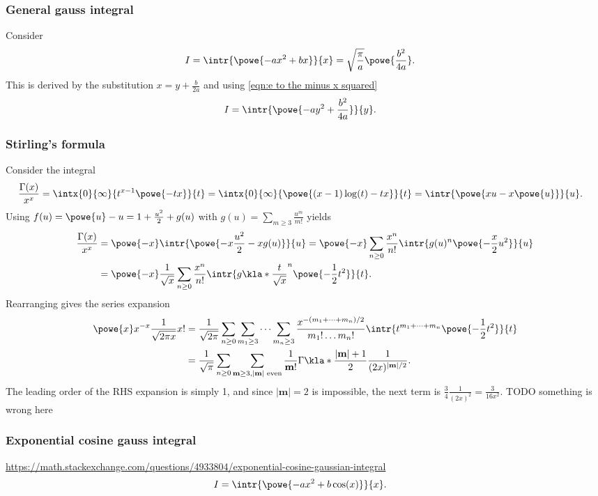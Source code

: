 \documentclass[english, parskip=full]{scrartcl}
\begin{document}
\subsubsection{General gauss integral}
Consider
\begin{align}
I &= \intr{\powe{-ax^2 + bx}}{x} = \sqrt{\frac{\pi}{a}} \powe{\frac{b^2}{4a}}. \label{eqn:e to the minus a x squared plus b x}
\end{align}
This is derived by the substitution $x = y + \frac{b}{2a}$ and using \autoref{eqn:e to the minus x squared}
\begin{align}
I &= \intr{\powe{-ay^2 + \frac{b^2}{4a}}}{y}.
\end{align}
\subsubsection{Stirling's formula}
Consider the integral
\begin{align}
\frac{\Gamma(x)}{x^{x}} &= \intx{0}{\infty}{t^{x-1}\powe{-tx}}{t} = \intx{0}{\infty}{ \powe{(x-1)\log(t) - tx} }{t} = \intr{\powe{xu - x\powe{u}}}{u}.
\end{align}
Using $f(u)=\powe{u}-u = 1 + \frac{u^2}{2} + g(u)$ with $g(u) = \sum_{m\ge 3} \frac{u^m}{m!}$ yields
\begin{align}
\frac{\Gamma(x)}{x^{x}} &= \powe{-x} \intr{\powe{-x\frac{u^2}{2} - xg(u)}}{u} = \powe{-x} \sum_{n\ge 0} \frac{x^n}{n!} \intr{g(u)^n \powe{-\frac{x}{2}u^2}}{u} \\
&= \powe{-x} \frac{1}{\sqrt{x}} \sum_{n\ge 0} \frac{x^n}{n!} \intr{g\kla*{\frac{t}{\sqrt{x}}}^n \powe{-\frac{1}{2}t^2}}{t}.
\end{align}
Rearranging gives the series expansion
\begin{align}
\powe{x} x^{-x} \frac{1}{\sqrt{2\pi x}} x! &= \frac{1}{\sqrt{2\pi}} \sum_{n\ge 0} \sum_{m_1\ge 3} \dots \sum_{m_n\ge 3} \frac{x^{-(m_1+\dots+m_n)/2}}{m_1!\dots m_n!} \intr{t^{m_1+\dots+m_n} \powe{-\frac{1}{2}t^2}}{t}\\
&= \frac{1}{\sqrt{\pi}} \sum_{n\ge 0} \sum_{\textbf{m}\ge 3, |\textbf{m}| \text{ even}} \frac{1}{\textbf{m}!} \Gamma\kla*{\frac{|\textbf{m}|+1}{2}} \frac{1}{(2x)^{|\textbf{m}|/2}}.
\end{align}
The leading order of the RHS expansion is simply 1, and since $|\textbf{m}|=2$ is impossible, the next term is $\frac{3}{4} \frac{1}{(2x)^2} = \frac{3}{16x^2}$.
TODO something is wrong here
\subsubsection{Exponential cosine gauss integral}
\url{https://math.stackexchange.com/questions/4933804/exponential-cosine-gaussian-integral}
\begin{align}
I &= \intr{\powe{-ax^2 + b\cos(x)}}{x}.
\end{align}
\end{document}
